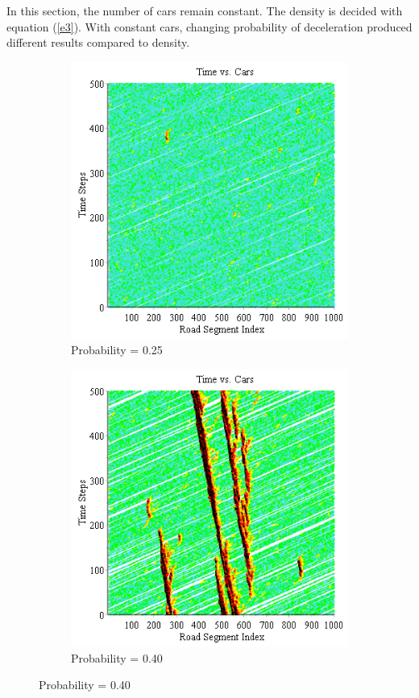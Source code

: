 \documentclass[12pt]{extarticle}
\begin{document}
In this section, the number of cars remain constant. The density is decided with equation (\ref{e3}). With constant cars, changing probability of deceleration produced different results compared to density.
\begin{figure}[h!]
	\caption{Roads = 1000, Cars = 100}
	\begin{subfigure}{0.50\textwidth}
		\includegraphics[scale=0.50]{Graph5.png}
		\caption{Probability = 0.25}
		\label{fig:img5}
	\end{subfigure}
	\begin{subfigure}{0.50\textwidth}
		\includegraphics[scale=0.50]{Graph6.png}
		\caption{Probability = 0.40}
		\label{fig:img6}
	\end{subfigure}
\end{figure}
\end{document}
